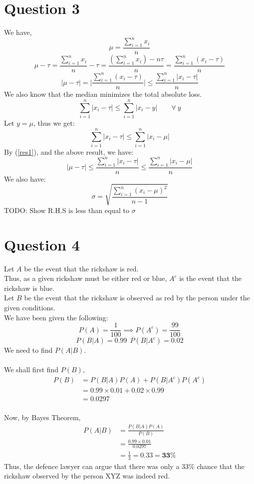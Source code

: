 \documentclass[11pt]{article}
\begin{document}
\newpage
\section*{Question 3}
We have,
$$ 
    \mu = \frac{\sum_{i=1}^n x_i}{n}
$$
$$
    \mu - \tau = \frac{\sum_{i=1}^n x_i}{n} - \tau = \frac{(\sum_{i=1}^nx_i) - n\tau}{n} = \frac{\sum_{i=1}^n (x_i - \tau)}{n}
$$
\begin{equation}
    \label{res1}
    |\mu - \tau| = \Bigg|\frac{\sum_{i=1}^n (x_i - \tau)}{n}\Bigg| \le \frac{\sum_{i=1}^n |x_i - \tau|}{n}
\end{equation}
We also know that the median minimizes the total absolute loss.
$$
    \sum_{i=1}^n |x_i - \tau| \le \sum_{i=1}^n |x_i - y| \hspace{2em} \forall \ y 
$$
Let $y = \mu$, thus we get:
$$ 
    \sum_{i=1}^n |x_i - \tau| \le \sum_{i=1}^n |x_i - \mu| 
$$ 
By (\ref{res1}), and the above result, we have:
$$
    |\mu - \tau| \le \frac{\sum_{i=1}^n |x_i - \tau|}{n} \le \frac{\sum_{i=1}^n |x_i - \mu|}{n}
$$
We also have:
$$
    \sigma = \sqrt{\frac{\sum_{i=1}^n (x_i - \mu)^2}{n-1}}
$$
TODO: Show R.H.S is less than equal to $\sigma$



\newpage
\section*{Question 4}
Let $A$ be the event that the rickshaw is red.\\
Thus, as a given rickshaw must be either red or blue, $A^c$ is the event that the rickshaw is blue.\\
Let $B$ be the event that the rickshaw is observed as red by the person under the given conditions.\\
We have been given the following:
$$
    P(A) = \frac{1}{100} \implies P(A^c) = \frac{99}{100}
$$
$$
    P(B|A) = 0.99 \ \  P(B|A^c) = 0.02
$$
We need to find $P(A|B)$. \\
\\
We shall first find $P(B)$,
$$
    \begin{aligned}
        P(B) & = P(B|A)P(A) + P(B|A^c)P(A^c)     \\
             & = 0.99\times0.01 + 0.02\times0.99 \\
             & = 0.0297
    \end{aligned}
$$
\\
Now, by Bayes Theorem,
$$
    \begin{aligned}
        P(A|B) & = \frac{P(B|A)P(A)}{P(B)}            \\
               & = \frac{0.99\times0.01}{0.0297}      \\
               & = \frac{1}{3} = 0.33 = \mathbf{33\%}
    \end{aligned}
$$
Thus, the defence lawyer can argue that there was only a $33\%$ chance that the rickshaw observed by the person XYZ was indeed red.
\end{document}
